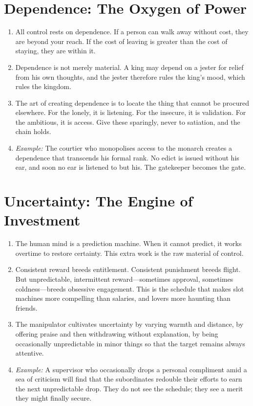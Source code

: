 \documentclass[12pt,a4paper,oneside]{book}
\begin{document}
\section{Dependence: The Oxygen of Power}
\begin{enumerate}[leftmargin=*, label=\arabic*.]
\item All control rests on dependence. If a person can walk away without cost, they are beyond your reach. If the cost of leaving is greater than the cost of staying, they are within it.
\item Dependence is not merely material. A king may depend on a jester for relief from his own thoughts, and the jester therefore rules the king's mood, which rules the kingdom.
\item The art of creating dependence is to locate the thing that cannot be procured elsewhere. For the lonely, it is listening. For the insecure, it is validation. For the ambitious, it is access. Give these sparingly, never to satiation, and the chain holds.
\item \textit{Example:} The courtier who monopolises access to the monarch creates a dependence that transcends his formal rank. No edict is issued without his ear, and soon no ear is listened to but his. The gatekeeper becomes the gate.
\end{enumerate}

\section{Uncertainty: The Engine of Investment}
\begin{enumerate}[leftmargin=*, label=\arabic*.]
\item The human mind is a prediction machine. When it cannot predict, it works overtime to restore certainty. This extra work is the raw material of control.
\item Consistent reward breeds entitlement. Consistent punishment breeds flight. But unpredictable, intermittent reward—sometimes approval, sometimes coldness—breeds obsessive engagement. This is the schedule that makes slot machines more compelling than salaries, and lovers more haunting than friends.
\item The manipulator cultivates uncertainty by varying warmth and distance, by offering praise and then withdrawing without explanation, by being occasionally unpredictable in minor things so that the target remains always attentive.
\item \textit{Example:} A supervisor who occasionally drops a personal compliment amid a sea of criticism will find that the subordinates redouble their efforts to earn the next unpredictable drop. They do not see the schedule; they see a merit they might finally secure.
\end{enumerate}
\end{document}
